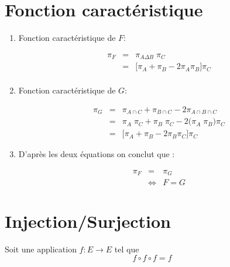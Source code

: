 \documentclass[12pt,a4paper,dvipsnames]{article}
\begin{document}
\section{Fonction caractéristique}%
\label{sec:fonction_caractéristique}

\begin{enumerate}
    \item Fonction caractéristique de $F$:

\begin{eqnarray*}
    \pi_{F} &=& \pi_{A\Delta B}\;\pi_C\\
            &=& \big[\pi_A + \pi_B - 2\pi_A\pi_B\big]\pi_C \\
\end{eqnarray*}


\item Fonction caractéristique de $G$:

    \begin{eqnarray*}
        \pi_G & = & \pi_{A\cap C}  + \pi_{B\cap C} - 2 \pi_{A\cap B\cap C}\\
              & = & \pi_A\;\pi_C   + \pi_B\;\pi_C  -
              2\big(\pi_A\;\pi_B\big)\pi_C\\
              & = & \big[\pi_A + \pi_B -2\pi_B\pi_C\big]\pi_C
    \end{eqnarray*}
\item D'après les deux équations on conclut que :

    \begin{eqnarray*}
        \pi_F &=& \pi_G\\
              &\iff  & F = G
    \end{eqnarray*}
\end{enumerate}

\section{Injection/Surjection}%
\label{sec:injection_surjection}

Soit une application  $f:E\longrightarrow E$ tel que
\begin{equation}
    \label{eq:equality_injec_surj}
    f\circ f \circ f = f
\end{equation}
\end{document}

